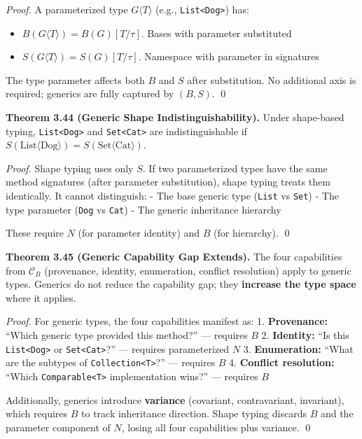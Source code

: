 \emph{Proof.} A parameterized type \(G\langle T \rangle\) (e.g.,
\texttt{List\textless{}Dog\textgreater{}}) has:
\begin{itemize}
  \item \(B(G\langle T \rangle) = B(G)[T/\tau]\). Bases with parameter substituted
  \item \(S(G\langle T \rangle) = S(G)[T/\tau]\). Namespace with parameter in signatures
\end{itemize}
The type parameter affects both $B$ and $S$ after substitution. No additional axis is required; generics are fully captured by $(B, S)$.
\qed

\textbf{Theorem 3.44 (Generic Shape Indistinguishability).} Under
shape-based typing, \texttt{List\textless{}Dog\textgreater{}} and
\texttt{Set\textless{}Cat\textgreater{}} are indistinguishable if
\(S(\text{List}\langle\text{Dog}\rangle) = S(\text{Set}\langle\text{Cat}\rangle)\).

\emph{Proof.} Shape typing uses only \(S\). If two parameterized types
have the same method signatures (after parameter substitution), shape
typing treats them identically. It cannot distinguish: - The base
generic type (\texttt{List} vs \texttt{Set}) - The type parameter
(\texttt{Dog} vs \texttt{Cat}) - The generic inheritance hierarchy

These require \(N\) (for parameter identity) and \(B\) (for hierarchy).
\qed

\textbf{Theorem 3.45 (Generic Capability Gap Extends).} The four
capabilities from \(\mathcal{C}_B\) (provenance, identity, enumeration,
conflict resolution) apply to generic types. Generics do not reduce the
capability gap; they \textbf{increase the type space} where it applies.

\emph{Proof.} For generic types, the four capabilities manifest as: 1.
\textbf{Provenance:} ``Which generic type provided this method?'' ---
requires \(B\) 2. \textbf{Identity:} ``Is this
\texttt{List\textless{}Dog\textgreater{}} or
\texttt{Set\textless{}Cat\textgreater{}}?'' --- requires parameterized
\(N\) 3. \textbf{Enumeration:} ``What are the subtypes of
\texttt{Collection\textless{}T\textgreater{}}?'' --- requires \(B\) 4.
\textbf{Conflict resolution:} ``Which
\texttt{Comparable\textless{}T\textgreater{}} implementation wins?'' ---
requires \(B\)

Additionally, generics introduce \textbf{variance} (covariant,
contravariant, invariant), which requires \(B\) to track inheritance
direction. Shape typing discards \(B\) and the parameter component of
\(N\), losing all four capabilities plus variance. \qed

